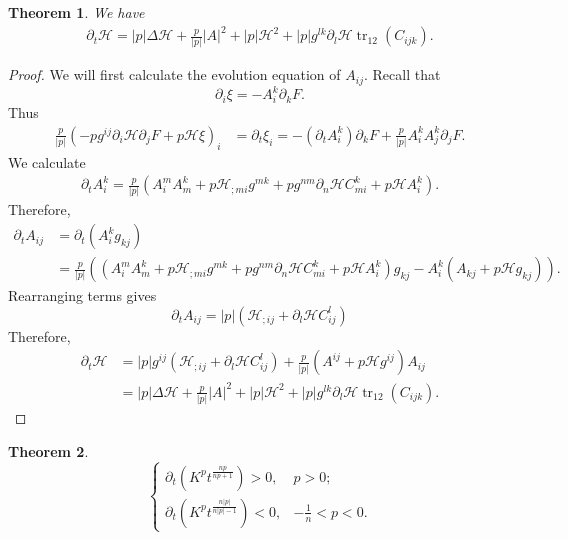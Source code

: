 \documentclass{amsart}
\newtheorem{theorem}{Theorem}
\theoremstyle{definition}
\theoremstyle{remark}
\numberwithin{equation}{section}
\begin{document}
\begin{theorem} We have
\begin{align*}
\partial_t\mathcal{H}= |p| \Delta \mathcal{H}+\frac{p}{|p|}| A |^2+ |p|  \mathcal{H}^2+ |p|  g^{lk}\partial_l\mathcal{H} \operatorname{tr}_{12}( C _{ijk}).
\end{align*}
\end{theorem}
\begin{proof}
We will first calculate the evolution equation of $ A _{ij}.$ Recall that $$\partial_i\xi=- A _i^k\partial_kF.$$ Thus
\begin{align*}
\frac{p}{|p|}\left(- p  g^{ij}\partial_i\mathcal{H}\partial_jF+ p  \mathcal{H}\xi\right)_i&=\partial_t\xi_i=-(\partial_t A _i^k)\partial_kF+\frac{p}{|p|} A _i^k A _j^k\partial_jF.
\end{align*}
We calculate
\begin{align*}
\partial_t A _i^k=\frac{p}{|p|}( A _i^m A _m^k+ p  \mathcal{H}_{;mi}g^{mk}+ p
g^{nm}\partial_n \mathcal{H} C _{mi}^k+ p  \mathcal{H} A _i^k).
\end{align*}
Therefore,
\begin{align*}
\partial_t A _{ij}&=\partial_t( A _i^kg_{kj})\\
&=\frac{p}{|p|}\left(\left( A _i^m A _m^k+ p  \mathcal{H}_{;mi}g^{mk}+ p
g^{nm}\partial_n \mathcal{H} C _{mi}^k+ p  \mathcal{H} A _i^k\right)g_{kj}- A _i^k
( A _{kj}+ p  \mathcal{H}g_{kj})\right).
\end{align*}
Rearranging terms gives
\[\partial_t  A _{ij}= |p|  (\mathcal{H}_{;ij}+  \partial_l\mathcal{H}  C _{ij}^l)\]
Therefore,
\begin{align*}
\partial_t\mathcal{H}&=|p|g^{ij}( \mathcal{H}_{;ij}+  \partial_l \mathcal{H} C ^l_{ij})+\frac{p}{|p|}( A ^{ij}+ p  \mathcal{H}g^{ij}) A _{ij}\\
&= |p| \Delta \mathcal{H}+\frac{p}{|p|}| A |^2+ |p|  \mathcal{H}^2+ |p|  g^{lk}\partial_l\mathcal{H} \operatorname{tr}_{12}( C _{ijk}).
\end{align*}
\end{proof}
\begin{theorem}
\[\left\{
  \begin{array}{ll}
    \partial_t \left(K^{ p }t^{\frac{n p }{n p +1}}\right)> 0, & p>0; \\
    \partial_t \left(K^{ p }t^{\frac{n |p| }{n |p| -1}}\right)<0, & -\frac{1}{n}<p<0.
  \end{array}
\right.
\]
\end{theorem}
\end{document}
